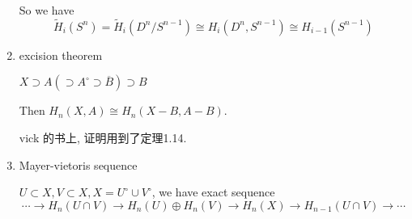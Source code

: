 \documentclass{ctexart}
\begin{document}
\begin{enumerate}
So we have
\[
\tilde{H}_i(S^n) = \tilde{H}_i(D^n/S^{n-1})\cong H_i(D^n,S^{n-1})\cong H_{i-1}(S^{n-1})
\]
\fi

\item excision theorem

$X \supset A (\supset A^{\circ} \supset \overline{B}) \supset B$

Then $H_n(X,A) \cong H_n(X-B,A-B)$.

vick 的书上\cite[p.47]{vick2012homology}, 证明用到了定理1.14\cite[p.20]{vick2012homology}.

\item Mayer-vietoris sequence

$U\subset X, V \subset X, X = U^{\circ} \cup V^{\circ}$, we have exact sequence
\[
\cdots\to H_n(U\cap V)\to H_n(U)\oplus H_n(V)\to H_n(X)\to H_{n-1}(U\cap V)\to\cdots
\]
\end{enumerate}
\newpage
\printbibliography
\end{document}

